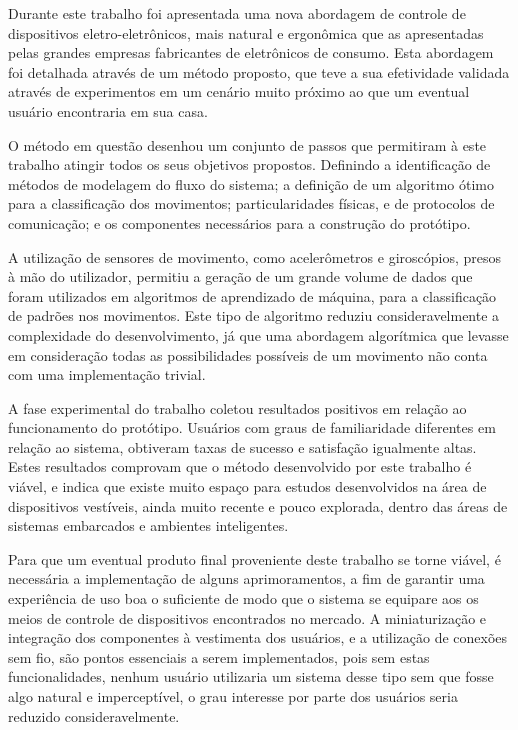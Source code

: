 \label{chapter:conclusao}

Durante este trabalho foi apresentada uma nova abordagem de controle de dispositivos eletro-eletrônicos, mais natural e ergonômica que as apresentadas pelas grandes empresas fabricantes de eletrônicos de consumo. Esta abordagem foi detalhada através de um método proposto, que teve a sua efetividade validada através de experimentos em um cenário muito próximo ao que um eventual usuário encontraria em sua casa. 

O método em questão desenhou um conjunto de passos que permitiram à este trabalho atingir todos os seus objetivos propostos. Definindo a identificação de métodos de modelagem do fluxo do sistema; a definição de um algoritmo ótimo para a classificação dos movimentos; particularidades físicas, e de protocolos de comunicação; e os componentes necessários para a construção do protótipo.

A utilização de sensores de movimento, como acelerômetros e giroscópios, presos à mão do utilizador, permitiu a geração de um grande volume de dados que foram utilizados em algoritmos de aprendizado de máquina, para a classificação de padrões nos movimentos. Este tipo de algoritmo reduziu consideravelmente a complexidade do desenvolvimento, já que uma abordagem algorítmica que levasse em consideração todas as possibilidades possíveis de um movimento não conta com uma implementação trivial.



A fase experimental do trabalho coletou resultados positivos em relação ao funcionamento do protótipo. Usuários com graus de familiaridade diferentes em relação ao sistema, obtiveram taxas de sucesso e satisfação igualmente altas. Estes resultados comprovam que o método desenvolvido por este trabalho é viável, e indica que existe muito espaço para estudos desenvolvidos na área de dispositivos vestíveis, ainda muito recente e pouco explorada, dentro das áreas de sistemas embarcados e ambientes inteligentes.


Para que um eventual produto final proveniente deste trabalho se torne viável, é necessária a implementação de alguns aprimoramentos, a fim de garantir uma experiência de uso boa o suficiente de modo que o sistema se equipare aos os meios de controle de dispositivos encontrados no mercado. A miniaturização e integração dos componentes à vestimenta dos usuários, e a utilização de conexões sem fio, são pontos essenciais a serem implementados, pois sem estas funcionalidades, nenhum usuário utilizaria um sistema desse tipo sem que fosse algo natural e imperceptível, o grau interesse por parte dos usuários seria reduzido consideravelmente.

